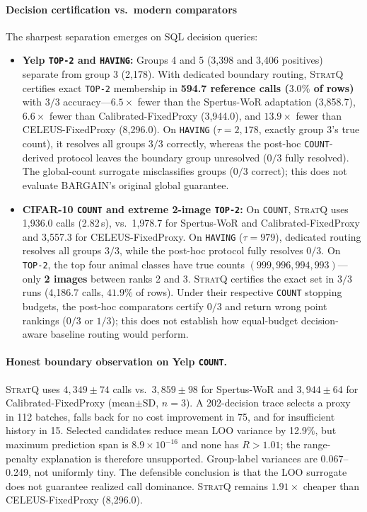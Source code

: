 \paragraph{Decision certification vs.\ modern comparators}
The sharpest separation emerges on SQL decision queries:
\begin{itemize}
  \item \textbf{Yelp \texttt{TOP-2} and \texttt{HAVING}:} Groups 4 and 5 (3,398 and 3,406 positives) separate from group 3 (2,178). With dedicated boundary routing, \textsc{StratQ} certifies exact \texttt{TOP-2} membership in \textbf{594.7 reference calls ($3.0\%$ of rows)} with $3/3$ accuracy---$6.5\times$ fewer than the Spertus-WoR adaptation (3,858.7), $6.6\times$ fewer than Calibrated-FixedProxy (3,944.0), and $13.9\times$ fewer than CELEUS-FixedProxy (8,296.0). On \texttt{HAVING} ($\tau=2{,}178$, exactly group 3's true count), it resolves all groups $3/3$ correctly, whereas the post-hoc \texttt{COUNT}-derived protocol leaves the boundary group unresolved ($0/3$ fully resolved). The global-count surrogate misclassifies groups ($0/3$ correct); this does not evaluate BARGAIN's original global guarantee.
  \item \textbf{CIFAR-10 \texttt{COUNT} and extreme 2-image \texttt{TOP-2}:} On \texttt{COUNT}, \textsc{StratQ} uses 1,936.0 calls (2.82\,s), vs.\ 1,978.7 for Spertus-WoR and Calibrated-FixedProxy and 3,557.3 for CELEUS-FixedProxy. On \texttt{HAVING} ($\tau=979$), dedicated routing resolves all groups $3/3$, while the post-hoc protocol fully resolves $0/3$. On \texttt{TOP-2}, the top four animal classes have true counts $(999, 996, 994, 993)$---only \textbf{2 images} between ranks 2 and 3. \textsc{StratQ} certifies the exact set in $3/3$ runs (4,186.7 calls, $41.9\%$ of rows). Under their respective \texttt{COUNT} stopping budgets, the post-hoc comparators certify $0/3$ and return wrong point rankings ($0/3$ or $1/3$); this does not establish how equal-budget decision-aware baseline routing would perform.
\end{itemize}

\paragraph{Honest boundary observation on Yelp \texttt{COUNT}.}
\textsc{StratQ} uses $4{,}349\pm74$ calls vs.\ $3{,}859\pm98$ for Spertus-WoR and $3{,}944\pm64$ for Calibrated-FixedProxy (mean$\pm$SD, $n=3$). A 202-decision trace selects a proxy in 112 batches, falls back for no cost improvement in 75, and for insufficient history in 15. Selected candidates reduce mean LOO variance by 12.9\%, but maximum prediction span is $8.9\times10^{-16}$ and none has $R>1.01$; the range-penalty explanation is therefore unsupported. Group-label variances are 0.067--0.249, not uniformly tiny. The defensible conclusion is that the LOO surrogate does not guarantee realized call dominance. \textsc{StratQ} remains $1.91\times$ cheaper than CELEUS-FixedProxy (8,296.0).

